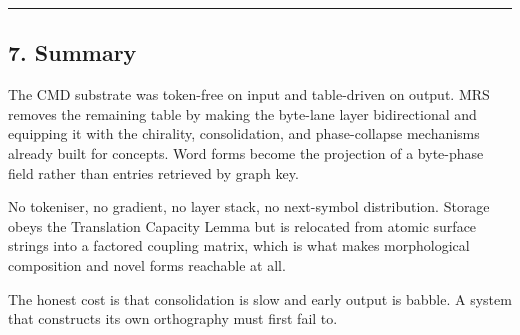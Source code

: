 \documentclass[
  11pt,
  a4paper,
]{article}
\begin{document}
\begin{center}\rule{0.5\linewidth}{0.5pt}\end{center}

\subsection{7. Summary}\label{summary}

The CMD substrate was token-free on input and table-driven on output.
MRS removes the remaining table by making the byte-lane layer
bidirectional and equipping it with the chirality, consolidation, and
phase-collapse mechanisms already built for concepts. Word forms become
the projection of a byte-phase field rather than entries retrieved by
graph key.

No tokeniser, no gradient, no layer stack, no next-symbol distribution.
Storage obeys the Translation Capacity Lemma but is relocated from
atomic surface strings into a factored coupling matrix, which is what
makes morphological composition and novel forms reachable at all.

The honest cost is that consolidation is slow and early output is
babble. A system that constructs its own orthography must first fail to.
\end{document}

